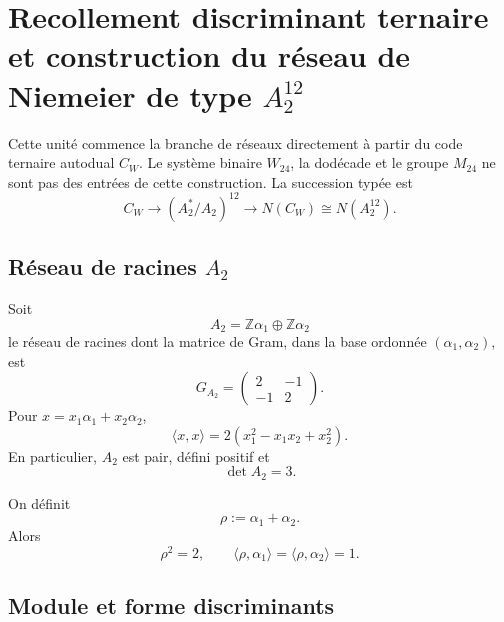 
\section{Recollement discriminant ternaire et construction du réseau de Niemeier de type \texorpdfstring{\(A_2^{12}\)}{A₂¹²}}
\label{p12-83-c20-s4:chap:pegado-niemeier-a2-doce}

Cette unité commence la branche de réseaux directement à partir du code ternaire
autodual \(C_W\). Le système binaire \(W_{24}\), la dodécade et le groupe
\(M_{24}\) ne sont pas des entrées de cette construction. La succession typée est
\[
 C_W
 \longrightarrow
 (A_2^*/A_2)^{12}
 \longrightarrow
 N(C_W)
 \cong N(A_2^{12}).
\]

\subsection{Réseau de racines \texorpdfstring{\(A_2\)}{A₂}}

Soit
\[
 A_2=\mathbb Z\alpha_1\oplus\mathbb Z\alpha_2
\]
le réseau de racines dont la matrice de Gram, dans la base ordonnée
\((\alpha_1,\alpha_2)\), est
\begin{equation}
 G_{A_2}=
 \begin{pmatrix}
 2&-1\\
 -1&2
 \end{pmatrix}.
 \label{p12-83-c20-s4:eq:gram-a2-autonomo}
\end{equation}
Pour \(x=x_1\alpha_1+x_2\alpha_2\),
\begin{equation}
 \langle x,x\rangle
 =2(x_1^2-x_1x_2+x_2^2).
 \label{p12-83-c20-s4:eq:norma-a2-autonoma}
\end{equation}
En particulier, \(A_2\) est pair, défini positif et
\[
 \det A_2=3.
\]

On définit
\[
 \rho:=\alpha_1+\alpha_2.
\]
Alors
\begin{equation}
 \rho^2=2,
 \qquad
 \langle\rho,\alpha_1\rangle
 =\langle\rho,\alpha_2\rangle=1.
 \label{p12-83-c20-s4:eq:identidades-rho-a2}
\end{equation}

\subsection{Module et forme discriminants}

